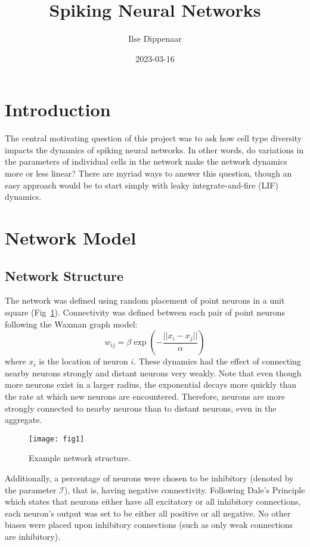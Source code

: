 \documentclass[12pt]{article}
\title{Spiking Neural Networks}
\author{Ilse Dippenaar}
\date{2023-03-16}
\begin{document}
\maketitle
\section{Introduction}

The central motivating question of this project was to ask how cell type diversity impacts the dynamics of spiking neural networks. In other words, do variations in the parameters of individual cells in the network make the network dynamics more or less linear? There are myriad ways to answer this question, though an easy approach would be to start simply with leaky integrate-and-fire (LIF) dynamics.

\section{Network Model}
\subsection{Network Structure}
The network was defined using random placement of point neurons in a unit square (Fig~\ref{fig:1}). Connectivity was defined between each pair of point neurons following the Waxman graph model:
$$
w_{ij}=\beta \exp\left(-\frac{||x_i-x_j||}{\alpha}\right)
$$
where $x_i$ is the location of neuron $i$. These dynamics had the effect of connecting nearby neurons strongly and distant neurons very weakly. Note that even though more neurons exist in a larger radius, the exponential decays more quickly than the rate at which new neurons are encountered. Therefore, neurons are more strongly connected to nearby neurons than to distant neurons, even in the aggregate.
\begin{figure}[h]
\centering
\texttt{[image: fig1]}
\caption{Example network structure.}
\label{fig:1}
\end{figure}

Additionally, a percentage of neurons were chosen to be inhibitory (denoted by the parameter $\mathcal{I}$), that is, having negative connectivity. Following Dale's Principle which states that neurons either have all excitatory or all inhibitory connections, each neuron's output was set to be either all positive or all negative. No other biases were placed upon inhibitory connections (such as only weak connections are inhibitory).
\end{document}
